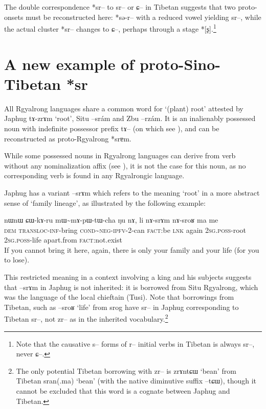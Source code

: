 \documentclass[oldfontcommands,oneside,a4paper,11pt]{article}
\newcommand{\ipa}[1]{{\phon #1}} %
\begin{document}
The double correspondence *\ipa{sr--} to \ipa{sr--} or \ipa{ɕ--} in Tibetan suggests that two proto-onsets must be reconstructed here: *\ipa{sə-r--} with a reduced vowel yielding \ipa{sr--}, while the actual cluster *\ipa{sr--} changes to \ipa{ɕ--}, perhaps through a stage *[\ipa{ʂ}].\footnote{Note that the causative \ipa{s--} forms of \ipa{r--} initial verbs in Tibetan is always \ipa{sr--}, never \ipa{ɕ--}.}



\section{A new example of proto-Sino-Tibetan *\ipa{sr}}
All Rgyalrong languages share a common word for `(plant) root' attested by Japhug \ipa{tɤ-zrɤm} `root', Situ \ipa{--srám} and Zbu \ipa{--rzám}. It is an inalienably possessed noun with indefinite possessor prefix \ipa{tɤ--} (on which see \citealt[4-5]{jacques14antipassive}), and can be reconstructed as proto-Rgyalrong *\ipa{srɐm}.

While some possessed nouns in Rgyalrong languages can derive from verb without any nominalization affix (see \citealt[3-7]{jacques14antipassive}), it is not the case for this noun, as no corresponding verb is found in any Rgyalrongic language.

Japhug has a variant \ipa{--srɤm} which refers to the meaning `root' in a more abstract sense of `family lineage', as illustrated by the following example:

\begin{exe}
\ex \label{ex:sram}
\gll
\ipa{nɯnɯ} 	\ipa{ɕɯ-kɤ-ru} 	\ipa{mɯ\textasciitilde{}mɤ-pɯ-tɯ-cha} 	\ipa{ŋu} 	\ipa{nɤ,} 	\ipa{li} 	\ipa{nɤ-srɤm} 	\ipa{nɤ-sroʁ} 	\ipa{ma} 	\ipa{me} \\
\textsc{dem} \textsc{transloc-inf}-bring \textsc{cond\textasciitilde{}neg-ipfv}-2-can \textsc{fact}:be \textsc{lnk} again \textsc{2sg.poss}-root \textsc{2sg.poss}-life apart.from \textsc{fact}:not.exist\\
\glt If you cannot bring it here, again, there is only your family and your life (for you to lose).
\end{exe}

This restricted meaning in a context involving a king and his subjects suggests that \ipa{--srɤm} in Japhug is not inherited: it is borrowed from Situ Rgyalrong, which was the language of the local chieftain (Tusi). Note that  borrowings from Tibetan, such as \ipa{--sroʁ} `life' from \ipa{srog} have \ipa{sr--} in Japhug corresponding to Tibetan \ipa{sr--}, not \ipa{zr--} as in the inherited vocabulary.\footnote{The only potential Tibetan borrowing with  \ipa{zr--} is \ipa{zrɤntɕɯ} `bean' from Tibetan \ipa{sran(.ma)} `bean' (with the native diminutive suffix \ipa{--tɕɯ}), though it cannot be excluded that this word is a cognate between Japhug and Tibetan. }
\end{document}
